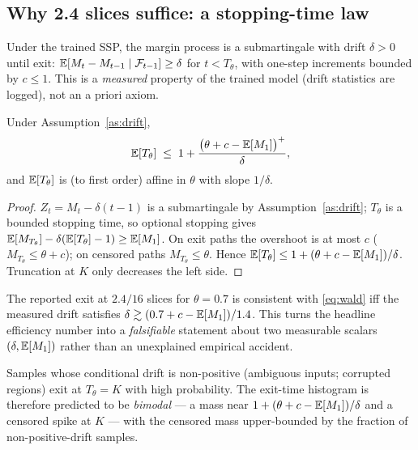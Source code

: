 \subsection{Why 2.4 slices suffice: a stopping-time law}

\begin{assumption}\label{as:drift}
Under the trained SSP, the margin process is a submartingale with drift
$\delta>0$ until exit: $\mathbb{E}[M_t-M_{t-1}\mid\mathcal{F}_{t-1}]\ge\delta$ for
$t< T_\theta$, with one-step increments bounded by $c\le 1$.
This is a \emph{measured} property of the trained model (drift statistics
are logged), not an a priori axiom.
\end{assumption}

\begin{theorem}\label{thm:stop}
Under Assumption~\ref{as:drift},
\begin{equation}
  \mathbb{E}[T_\theta]\;\le\;1+\frac{\big(\theta+c-\mathbb{E}[M_1]\big)^{+}}{\delta},
  \label{eq:wald}
\end{equation}
and $\mathbb{E}[T_\theta]$ is (to first order) affine in $\theta$ with slope
$1/\delta$.
\end{theorem}
\begin{proof}
$Z_t = M_t-\delta (t-1)$ is a submartingale by Assumption~\ref{as:drift};
$T_\theta$ is a bounded stopping time, so optional stopping gives
$\mathbb{E}[M_{T_\theta}]-\delta(\mathbb{E}[T_\theta]-1)\ge \mathbb{E}[M_1]$. On exit paths the
overshoot is at most $c$ ($M_{T_\theta}\le\theta+c$); on censored paths
$M_{T_\theta}\le\theta$. Hence
$\mathbb{E}[T_\theta]\le 1+(\theta+c-\mathbb{E}[M_1])/\delta$. Truncation at $K$ only
decreases the left side.
\end{proof}

\begin{corollary}[The $\theta=0.7$ operating point]\label{cor:24}
The reported exit at $2.4/16$ slices for $\theta=0.7$ is consistent with
\eqref{eq:wald} iff the measured drift satisfies
$\delta \gtrsim (0.7+c-\mathbb{E}[M_1])/1.4$. This turns the headline efficiency
number into a \emph{falsifiable} statement about two measurable scalars
$(\delta, \mathbb{E}[M_1])$ rather than an unexplained empirical accident.
\end{corollary}

\begin{corollary}\label{cor:bimodal}
Samples whose conditional drift is non-positive (ambiguous inputs; corrupted
regions) exit at $T_\theta=K$ with high probability. The exit-time histogram
is therefore predicted to be \emph{bimodal} --- a mass near
$1+(\theta+c-\mathbb{E}[M_1])/\delta$ and a censored spike at $K$ --- with the
censored mass upper-bounded by the fraction of non-positive-drift samples.
\end{corollary}

